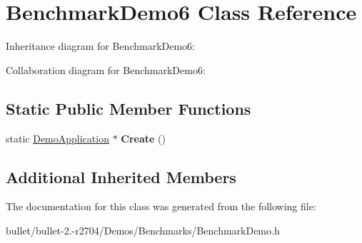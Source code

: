 \hypertarget{class_benchmark_demo6}{\section{Benchmark\+Demo6 Class Reference}
\label{class_benchmark_demo6}
}


Inheritance diagram for Benchmark\+Demo6\+:


Collaboration diagram for Benchmark\+Demo6\+:
\subsection*{Static Public Member Functions}
\begin{DoxyCompactItemize}
\item 
\hypertarget{class_benchmark_demo6_a4136fdde73e093b725e21bd9157e3a97}{static \hyperlink{class_demo_application}{Demo\+Application} $\ast$ {\bfseries Create} ()}\label{class_benchmark_demo6_a4136fdde73e093b725e21bd9157e3a97}

\end{DoxyCompactItemize}
\subsection*{Additional Inherited Members}


The documentation for this class was generated from the following file\+:\begin{DoxyCompactItemize}
\item 
bullet/bullet-\/2.-\/r2704/\+Demos/\+Benchmarks/Benchmark\+Demo.\+h\end{DoxyCompactItemize}
